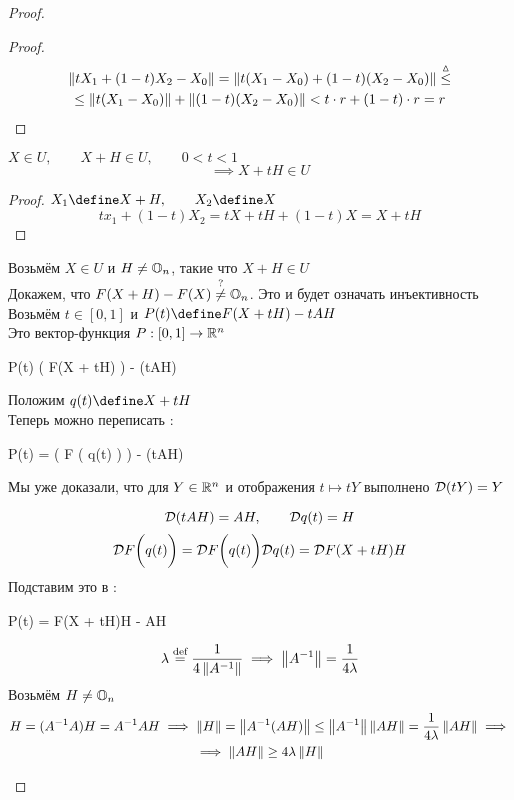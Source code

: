 \begin{proof}
\begin{enumerate}
\begin{proof}
\begin{multline*}
				\left\|{tX_1 + (1 - t)X_2 - X_0}\right\| = \left\|{t(X_1 - X_0) + (1 - t)(X_2 - X_0)}\right\| \stackrel\vartriangle\le \\
				\le \left\|{t(X_1 - X_0)}\right\| + \left\|{(1 - t)(X_2 - X_0)}\right\| < t \cdot r + (1 - t) \cdot r = r
			\end{multline*}
		\end{proof}
		\begin{implication}
			$ X \in U, \qquad X + H \in U, \qquad 0 < t < 1 $
			$$ \implies X + tH \in U $$
		\end{implication}
		\begin{proof}
			$ X_1 \define X + H, \qquad X_2 \define X $
			$$ tx_1 + (1 - t)X_2 = tX + tH + (1 - t)X = X + tH $$
		\end{proof}
		Возьмём $ X \in U $ и $ H \ne \mathbb{O}_{n} $, такие что $ X + H \in U $ \\
		Докажем, что $ F(X + H) - F(X) \stackrel?\ne \mathbb{O}_{n} $. Это и будет означать инъективность \\
		Возьмём $ t \in [0, 1] $ и $ P(t) \define F(X + tH) - tAH $ \\
		Это вектор-функция $ P : [0, 1] \to \mathbb{R}^n $
		\begin{equ}{26}
			P(t)   \bigg( F(X + tH) \bigg) - (tAH)
		\end{equ}
		Положим $ q(t) \define X + tH $ \\
		Теперь можно переписать \eref{26}:
		\begin{equ}{27}
			\mc{D}P(t) =  \bigg( F \big( q(t) \big) \bigg) - \mc{D}(tAH)
		\end{equ}
		\begin{remind}
			Мы уже доказали, что для $ Y \in \mathbb{R}^n $ и отображения $ t \mapsto tY $ выполнено $ (tY) = Y $
		\end{remind}
		$$ \mathcal{D}(tAH) = AH, \qquad \mathcal{D}q(t) = H $$
		$$ \mathcal{D}F \bigg( q(t) \bigg) = \mathcal{D}F \bigg( q(t) \bigg)\mathcal{D}q(t) = \mathcal{D}F(X + tH)H $$
		Подставим это в \eref{27}:
		\begin{equ}{28}
			\mc{D}P(t) = F(X + tH)H - AH
		\end{equ}
		$$ \lambda \stackrel{\text{def}}{=} \frac1{4\left\|{A^{-1}}\right\|} \implies \left\|{A^{-1}}\right\| = \frac1{4\lambda} $$
		Возьмём $ H \ne \mathbb{O}_{n} $
		\begin{multline}\lbl{29}
			H = (A^{-1}A)H = A^{-1}AH \implies \norm{H} = \norm{A^{-1}(AH)} \le \norm{A^{-1}}\norm{AH} = \frac1{4\lambda}\norm{AH} \implies \\
			\implies \norm{AH} \ge 4\lambda\norm{H}
		\end{multline}

\end{enumerate}
\end{proof}
